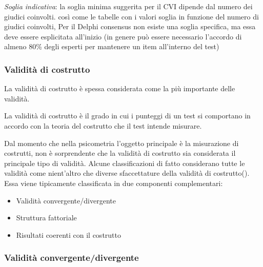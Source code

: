 \documentclass[
  italian,
  letterpaper,
  paper=A4,
  headinclude=on,
  footinclude=on,
  12pt]{scrbook}
\providecommand{\tightlist}{%
  \setlength{\itemsep}{0pt}\setlength{\parskip}{0pt}}
\begin{document}
\emph{Soglia indicativa}: la soglia minima suggerita per il CVI dipende
dal numero dei giudici coinvolti. così come le tabelle con i valori
soglia in funzione del numero di giudici coinvolti, Per il Delphi
consensus non esiste una soglia specifica, ma essa deve essere
esplicitata all'inizio (in genere può essere necessario l'accordo di
almeno 80\% degli esperti per mantenere un item all'interno del test)

\subsubsection{Validità di costrutto}\label{validituxe0-di-costrutto}

La validità di costrutto è spessa considerata come la più importante
delle validità.

\begin{tcolorbox}[enhanced jigsaw, left=2mm, colbacktitle=quarto-callout-note-color!10!white, bottomrule=.15mm, opacityback=0, coltitle=black, colframe=quarto-callout-note-color-frame, opacitybacktitle=0.6, leftrule=.75mm, colback=white, toprule=.15mm, title=\textcolor{quarto-callout-note-color}{\faInfo}\hspace{0.5em}{Definizione}, titlerule=0mm, arc=.35mm, breakable, rightrule=.15mm, bottomtitle=1mm, toptitle=1mm]

La validità di costrutto è il grado in cui i punteggi di un test si
comportano in accordo con la teoria del costrutto che il test intende
misurare.

\end{tcolorbox}

Dal momento che nella psicometria l'oggetto principale è la misurazione
di costrutti, non è sorprendente che la validità di costrutto sia
considerata il principale tipo di validità. Alcune classificazioni di
fatto considerano tutte le validità come nient'altro che diverse
sfaccettature della validità di
costrutto(\cite{slick2006psychometrics}). Essa viene tipicamente
classificata in due componenti complementari:

\begin{itemize}
\tightlist
\item
  Validità convergente/divergente
\item
  Struttura fattoriale
\item
  Risultati coerenti con il costrutto
\end{itemize}

\subsubsection{Validità
convergente/divergente}\label{validituxe0-convergentedivergente}
\end{document}
